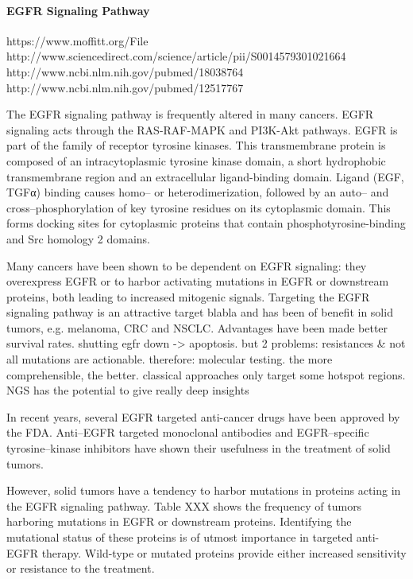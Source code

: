       \paragraph{EGFR Signaling Pathway}

https://www.moffitt.org/File%
http://www.sciencedirect.com/science/article/pii/S0014579301021664
http://www.ncbi.nlm.nih.gov/pubmed/18038764
http://www.ncbi.nlm.nih.gov/pubmed/12517767

      The EGFR signaling pathway is frequently altered in
      many cancers. EGFR signaling acts through the RAS-RAF-MAPK and PI3K-Akt pathways.
      EGFR is part of the family of receptor tyrosine kinases. This transmembrane
      protein is composed of an intracytoplasmic tyrosine kinase domain, a short
      hydrophobic transmembrane region and an extracellular ligand-binding domain.
      Ligand (EGF, TGFα) binding causes homo-- or heterodimerization, followed by
      an auto-- and cross--phosphorylation of key tyrosine residues on its
      cytoplasmic domain. This forms docking sites for cytoplasmic proteins that
      contain phosphotyrosine-binding and Src homology 2 domains.

      Many cancers have been shown to be dependent on EGFR signaling: they
      overexpress EGFR or to harbor activating mutations in EGFR or downstream
      proteins, both leading to increased mitogenic signals. Targeting the EGFR
      signaling pathway is an attractive target blabla and has been of benefit in
      solid tumors, e.g. melanoma, CRC and NSCLC. Advantages have been made better
      survival rates. shutting egfr down -> apoptosis. but 2 problems: resistances &
      not all mutations are actionable. therefore: molecular testing. the more
      comprehensible, the better. classical approaches only target some hotspot
      regions. NGS has the potential to give really deep insights

      In recent years, several EGFR targeted anti-cancer drugs have been
      approved by the FDA. Anti--EGFR targeted monoclonal antibodies and
      EGFR--specific tyrosine--kinase inhibitors have shown their usefulness in
      the treatment of solid tumors.

      However, solid tumors have a tendency to harbor mutations in proteins
      acting in  the EGFR signaling pathway. Table XXX shows the frequency of
      tumors  harboring mutations in EGFR or downstream proteins. Identifying
      the mutational status of these proteins is of utmost importance in
      targeted anti-EGFR therapy. Wild-type or mutated proteins provide either
      increased sensitivity or resistance to the treatment.


